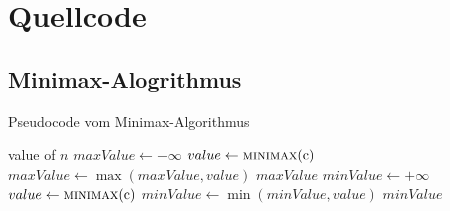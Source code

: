 \chapter{Quellcode}
\label{anhang:chapter-quellcode}



\section{Minimax-Alogrithmus}


\begin{algorithm}
    \caption{Pseudocode vom Minimax-Algorithmus}
    \label{algo:minimax}
    \begin{algorithmic}[1]
                \State \Return value of $n$
                \State $maxValue \gets -\infty$
                    \State $value \gets \Call{minimax}{$c$}$
                    \State $maxValue \gets \max(maxValue, value)$
                \EndFor
                \State \Return $maxValue$
                \State $minValue \gets +\infty$
                    \State $value \gets \Call{minimax}{$c$}$
                    \State $minValue \gets \min(minValue, value)$
                \EndFor
                \State \Return $minValue$
            \EndIf
        \EndFunction
    \end{algorithmic}
\end{algorithm}